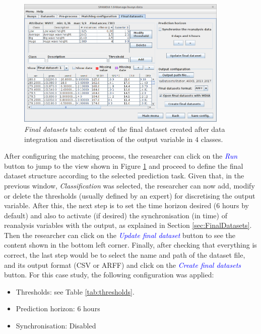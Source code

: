 \documentclass[review]{elsarticle}
\begin{document}
			\begin{figure}[ht!]
				\centering
				\includegraphics[width=0.90\textwidth]{figures/FigureFinal_datasets.png}
				\caption{\textit{Final datasets} tab: content of the final dataset created after data integration and discretisation of the output variable in $4$ classes.}\label{fig:final_dataset}
			\end{figure}
			
			After configuring the matching process, the researcher can click on the \textcolor{blue}{\textit{Run}} button to jump to the view shown in Figure \ref{fig:final_dataset} and proceed to define the final dataset structure according to the selected prediction task. Given that, in the previous window, \textit{Classification} was selected, the researcher can now add, modify or delete the thresholds (usually defined by an expert) for discretising the output variable. After this, the next step is to set the time horizon desired (6 hours by default) and also to activate (if desired) the synchronisation (in time) of reanalysis variables with the output, as explained in Section {\ref{sec:FinalDatasets}}. Then the researcher can click on the \textcolor{blue}{\textit{Update final dataset}} button to see the content shown in the bottom left corner. Finally, after checking that everything is correct, the last step would be to select the name and path of the dataset file, and its output format (CSV or ARFF) and click on the \textcolor{blue}{\textit{Create final datasets}} button. For this case study, the following configuration was applied:
			\begin{itemize}
				\item Thresholds: see Table \ref{tab:thresholds}.
				\item Prediction horizon: 6 hours
				\item Synchronisation: Disabled
			\end{itemize}
			
\end{document}
